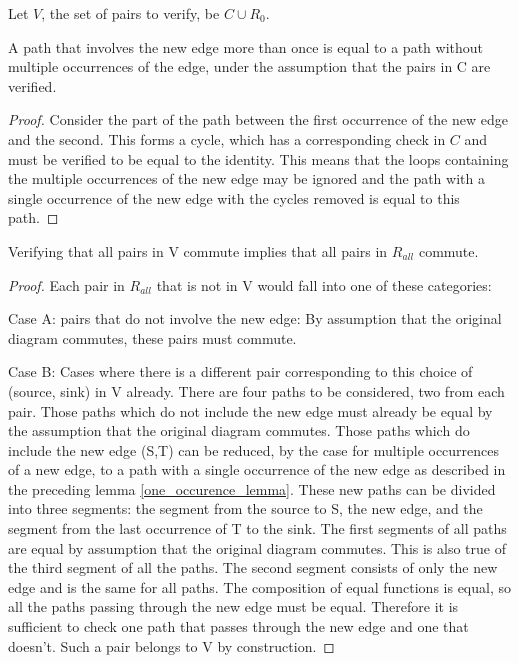 \documentclass[sigplan,review,anonymous]{acmart}
\begin{document}
{Let $V$, the set of pairs to verify, be $C \cup R_0$.

\begin{lemma}
\label{one_occurence_lemma}
A path that involves the new edge more than once is equal to a path without multiple occurrences of the edge, under the assumption that the pairs in C are verified.
\end{lemma}
\begin{proof}
Consider the part of the path between the first occurrence of the new edge and the second. This forms a cycle, which has a corresponding check in $C$ and must be verified to be equal to the identity.
This means that the loops containing the multiple occurrences of the new edge may be ignored and the path with a single occurrence of the new edge with the cycles removed is equal to this path.
\end{proof}

\begin{theorem}
\label{verifyingSet}
Verifying that all pairs in V commute implies that all pairs in $R_{all}$ commute.
\end{theorem}
\begin{proof}

Each pair in $R_{all}$ that is not in V would fall into one of these categories:

Case A: pairs that do not involve the new edge: By assumption that the original diagram commutes, these pairs must commute.

Case B: Cases where there is a different pair corresponding to this choice of (source, sink) in V already.
There are four paths to be considered, two from each pair. Those paths which do not include the new edge must already be equal by the assumption that the original diagram commutes.
Those paths which do include the new edge (S,T) can be reduced, by the case for multiple occurrences of a new edge, to a path with a single occurrence of the new edge as described in the preceding lemma \ref{one_occurence_lemma}. These new paths can be divided into three segments: the segment from the source to S, the new edge, and the segment from the last occurrence of T to the sink. The first segments of all paths are equal by assumption that the original diagram commutes. This is also true of the third segment of all the paths. The second segment consists of only the new edge and is the same for all paths. The composition of equal functions is equal, so all the paths passing through the new edge must be equal.
Therefore it is sufficient to check one path that passes through the new edge and one that doesn't. Such a pair belongs to V by construction.
\end{proof}

}
\end{document}
